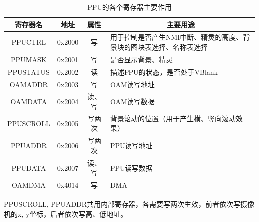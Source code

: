 \documentclass[a4paper]{ltxdoc}
\begin{document}
{\begin{table}[h]
\centering
\caption{PPU的各个寄存器主要作用}
\label{tab:ppu_registers}
\begin{tabularx}{\textwidth}{|c|c|c|X|}
\hline
\rowcolor[HTML]{8DCDFF}
\hline
\rowcolor[HTML]{8DCDFF}
寄存器名      & 地址     & 属性  & \multicolumn{1}{c|}{\cellcolor[HTML]{8DCDFF}主要用途} \\ \hline
PPUCTRL   & 0x2000 & 写   & 用于控制是否产生NMI中断、精灵的高度、背景块的图块表选择、名称表选择               \\ \hline
PPUMASK   & 0x2001 & 写   & 是否显示背景、精灵                                         \\ \hline
PPUSTATUS & 0x2002 & 读   & 描述PPU的状态，是否处于VBlank                               \\ \hline
OAMADDR   & 0x2003 & 写   & OAM读写地址                                           \\ \hline
OAMDATA   & 0x2004 & 读、写 & OAM读写数据                                           \\ \hline
PPUSCROLL & 0x2005 & 写两次 & 背景滚动的位置（用于产生横、竖向滚动效果）                             \\ \hline
PPUADDR   & 0x2006 & 写两次 & PPU读写地址                                           \\ \hline
PPUDATA   & 0x2007 & 读、写 & PPU读写数据                                           \\ \hline
OAMDMA    & 0x4014 & 写   & DMA                                               \\ \hline
\end{tabularx}
\end{table}

PPUSCROLL, PPUADDR共用内部寄存器\cite{ppuscrolling}，各需要写两次生效，前者依次写摄像机的x, y坐标，后者依次写高、低地址。

}
\end{document}
